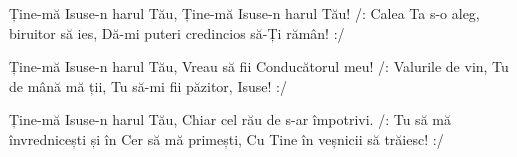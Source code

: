 \beginverse
Ține-mă Isuse-n harul Tău,
Ține-mă Isuse-n harul Tău!
/: Calea Ta s-o aleg, biruitor să ies,
Dă-mi puteri credincios să-Ți rămân! :/
\endverse

\beginverse
Ține-mă Isuse-n harul Tău,
Vreau să fii Conducătorul meu!
/: Valurile de vin, Tu de mână mă ții,
Tu să-mi fii păzitor, Isuse! :/
\endverse

\beginverse
Ține-mă Isuse-n harul Tău,
Chiar cel rău de s-ar împotrivi.
/: Tu să mă învrednicești și în Cer să mă primești,
Cu Tine în veșnicii să trăiesc! :/
\endverse
\endsong